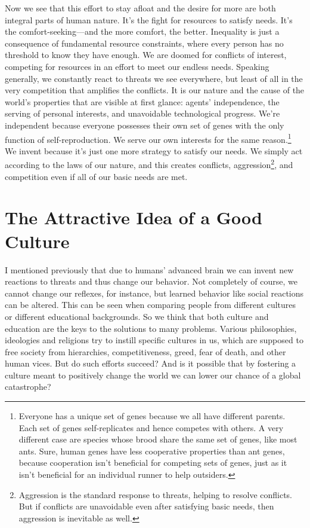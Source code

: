 \documentclass[12pt]{report}
\begin{document}
\noindent Now we see that this effort to stay afloat and the desire for more are both integral parts of human nature. It’s the fight for resources to satisfy needs. It’s the comfort-seeking\thinspace---\thinspace and the more comfort, the better. Inequality is just a consequence of fundamental resource constraints, where every person has no threshold to know they have enough. We are doomed for conflicts of interest, competing for resources in an effort to meet our endless needs. Speaking generally, we constantly react to threats we see everywhere, but least of all in the very competition that amplifies the conflicts. It is our nature and the cause of the world’s properties that are visible at first glance: agents’ independence, the serving of personal interests, and unavoidable technological progress. We’re independent because everyone possesses their own set of genes with the only function of self-reproduction. We serve our own interests for the same reason.\footnote{Everyone has a unique set of genes because we all have different parents. Each set of genes self-replicates and hence competes with others. A very different case are species whose brood share the same set of genes, like most ants. Sure, human genes have less cooperative properties than ant genes, because cooperation isn’t beneficial for competing sets of genes, just as it isn’t beneficial for an individual runner to help outsiders.} We invent because it’s just one more strategy to satisfy our needs. We simply act according to the laws of our nature, and this creates conflicts, aggression\footnote{Aggression is the standard response to threats, helping to resolve conflicts. But if conflicts are unavoidable even after satisfying basic needs, then aggression is inevitable as well.}, and competition even if all of our basic needs are met.

\section*{The Attractive Idea of a Good Culture}

I mentioned previously that due to humans’ advanced brain we can invent new reactions to threats and thus change our behavior. Not completely of course, we cannot change our reflexes, for instance, but learned behavior like social reactions can be altered. This can be seen when comparing people from different cultures or different educational backgrounds. So we think that both culture and education are the keys to the solutions to many problems. Various philosophies, ideologies and religions try to instill specific cultures in us, which are supposed to free society from hierarchies, competitiveness, greed, fear of death, and other human vices. But do such efforts succeed? And is it possible that by fostering a culture meant to positively change the world we can lower our chance of a global catastrophe?
\end{document}
